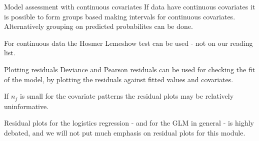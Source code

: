 \documentclass[
  ignorenonframetext,
]{beamer}
\begin{document}
\begin{frame}
\begin{block}{Model assessment with continuous covariates}
\protect\hypertarget{model-assessment-with-continuous-covariates}{}
If data have continuous covariates it is possible to form groups based
making intervals for continuous covariates. Alternatively grouping on
predicted probabilites can be done.

For continuous data the Hosmer Lemeshow test can be used - not on our
reading list.
\end{block}
\end{frame}

\begin{frame}
\begin{block}{Plotting residuals}
\protect\hypertarget{plotting-residuals}{}
Deviance and Pearson residuals can be used for checking the fit of the
model, by plotting the residuals against fitted values and covariates.

If \(n_j\) is small for the covariate patterns the residual plots may be
relatively uninformative.

Residual plots for the logistics regression - and for the GLM in general
- is highly debated, and we will not put much emphasis on residual plots
for this module.
\end{block}
\end{frame}
\end{document}
